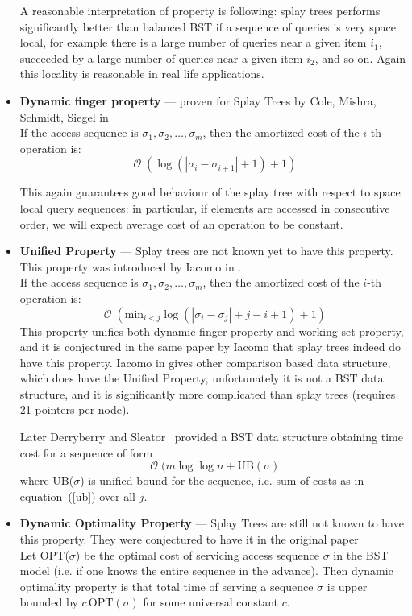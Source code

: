 \documentclass[11pt]{article}
\DeclareMathOperator*{\Oh}{\mathcal{O}}
\begin{document}
\begin{itemize}
		A reasonable interpretation of property is following: splay trees performs significantly better than balanced BST if a sequence of queries is very space local, for example there is a large number of queries near a given item $i_1$, succeeded by a large number of queries near a given item $i_2$, and so on. Again this locality is reasonable in real life applications.
	\item {\bf Dynamic finger property} --- proven for Splay Trees by Cole, Mishra, Schmidt, Siegel in \cite{DBLP:journals/siamcomp/ColeMSS00}\cite{DBLP:journals/siamcomp/Cole00} \\
		If the access sequence is $\sigma_1, \sigma_2, \ldots, \sigma_m$, then the amortized cost of the $i$-th operation is:
		\begin{equation*}
			\Oh(\log(|\sigma_i - \sigma_{i+1}| + 1) + 1)
		\end{equation*}

		This again guarantees good behaviour of the splay tree with respect to space local query sequences: in particular, if elements are accessed in consecutive order, we will expect average cost of an operation to be constant. 
	\item {\bf Unified Property} --- Splay trees are not known yet to have this property. This property was introduced by Iacomo in \cite{DBLP:conf/soda/Iacono01a}. \\
		If the access sequence is $\sigma_1, \sigma_2, \ldots, \sigma_m$, then the amortized cost of the $i$-th operation is:
		\begin{equation}
			\Oh(\mathrm{min}_{i < j} \log(|\sigma_i - \sigma_j| + j-i + 1) + 1) \label{ub}
		\end{equation}
		This property unifies both dynamic finger property and working set property, and it is conjectured in the same paper by Iacomo that splay trees indeed do have this property. Iacomo in \cite{DBLP:conf/soda/Iacono01a} gives other comparison based data structure, which does have the Unified Property, unfortunately it is not a BST data structure, and it is significantly more complicated than splay trees (requires 21 pointers per node).

		Later Derryberry and Sleator~\cite{DBLP:conf/wads/DerryberryS09} provided a BST data structure obtaining time cost for a sequence of form
		\begin{equation*}
			\Oh(m\log\log n + \mathrm{UB}(\sigma)
		\end{equation*}
		where UB($\sigma$) is unified bound for the sequence, i.e. sum of costs as in equation~(\ref{ub}) over all $j$.
	\item {\bf Dynamic Optimality Property} --- Splay Trees are still not known to have this property. They were conjectured to have it in the original paper \cite{DBLP:journals/jacm/SleatorT85} \\
		Let OPT($\sigma$) be the optimal cost of servicing access sequence $\sigma$ in the BST model (i.e. if one knows the entire sequence in the advance). Then dynamic optimality property is that total time of serving a sequence $\sigma$ is upper bounded by $c\, \mathrm{OPT}(\sigma)$ for some universal constant $c$.


\end{itemize}
\end{document}

